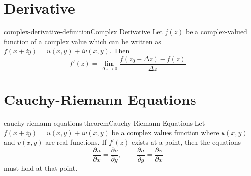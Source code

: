 \documentclass[preview]{standalone}
\begin{document}
  
\genpage

\section{Derivative}

\begin{snippetdefinition}{complex-derivative-definition}{Complex Derivative}
    Let \(f(z)\) be a complex-valued function
    of a complex value which can be written as
    \(f(x+iy)=u(x,y)+iv(x,y)\). Then
    \[
        f'(z) = \lim_{\Delta z \to 0} \frac{f(z_0 + \Delta z)-f(z)}{\Delta z}
    \]
\end{snippetdefinition}

\section{Cauchy-Riemann Equations}

\begin{snippettheorem}{cauchy-riemann-equations-theorem}{Cauchy-Riemann Equations}
    Let \(f(x+iy)=u(x,y)+iv(x,y)\) be a complex values function
    where \(u(x,y)\) and \(v(x,y)\) are real functions.
    If \(f'(z)\) exists at a point, then the equations
    \[
        \frac{\partial u}{\partial x}=\frac{\partial v}{\partial y},
        \quad
        -\frac{\partial u}{\partial y}=\frac{\partial v}{\partial x}
    \]
    must hold at that point.
\end{snippettheorem}
\end{document}

